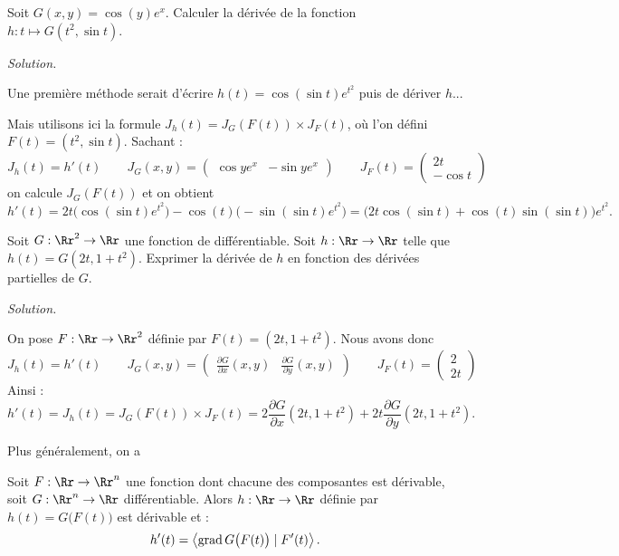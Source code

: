 \documentclass[12pt, class=report,crop=false]{standalone}
\begin{document}
\begin{exemple}
Soit $G(x,y)=\cos(y) e^{x}$. Calculer la dérivée de la fonction $h :t \mapsto G(t^2,\sin t)$.

\bigskip
\emph{Solution.}

Une première méthode serait d'écrire $h(t) = \cos(\sin t) e^{t^2}$ puis de dériver $h$...

Mais utilisons ici la formule
$J_h (t) = J_G ( F(t) ) \times J_F (t)$, où l'on défini $F(t) = (t^2,\sin t)$.
Sachant :
$$J_h(t) = h'(t) \qquad
J_G(x,y) = \begin{pmatrix} \cos y e^{x} & -\sin y e^{x}\end{pmatrix} \qquad
J_F (t) = \begin{pmatrix} 2t \\ -\cos t \end{pmatrix}$$ 
on calcule $J_G( F(t) )$ et on obtient 
$$h'(t) =  2t \big( \cos (\sin t) e^{t^2}\big) -\cos(t)\big(-\sin (\sin t) e^{t^2} \big)
= \big(2t \cos (\sin t)+\cos(t) \sin (\sin t) \big)e^{t^2}.$$ 
\end{exemple}



\begin{exemple}
Soit $G : \Rr^2 \to \Rr$ une fonction de différentiable. 
Soit $h : \Rr \to \Rr$ telle que $h(t)=G(2t,1+t^2)$.
Exprimer la dérivée de $h$ en fonction des dérivées partielles de $G$.


\bigskip
\emph{Solution.}

On pose $F: \Rr \to \Rr^2$ définie par $F(t) = (2t,1+t^2)$.
Nous avons donc 
$$J_h(t) = h'(t) \qquad
J_G(x,y) = \begin{pmatrix} \frac{\partial G}{\partial x}(x,y)
&  \frac{\partial G}{\partial y}(x,y)  \end{pmatrix} \qquad
J_F (t) = \begin{pmatrix} 2 \\ 2t \end{pmatrix}$$ 
Ainsi :
$$h'(t) = J_h (t) = J_G ( F(t) ) \times J_F (t) =
2\frac{\partial G}{\partial x}(2t,1+t^2)  +
2t\frac{\partial G}{\partial y}(2t,1+t^2).
$$
\end{exemple}


\bigskip


Plus généralement, on a 
\begin{proposition}
Soit $F : \Rr \to \Rr^n$ une fonction dont chacune des composantes est dérivable, soit $G : \Rr^n \to \Rr$ différentiable. Alors $h : \Rr \to \Rr$
définie par $h(t) = G\big( F(t) \big)$ est dérivable et :
$$h'(t) = \left\langle \operatorname{grad} G \big( F(t) \big) \mid F'(t) \right\rangle.$$
\end{proposition}
\end{document}
